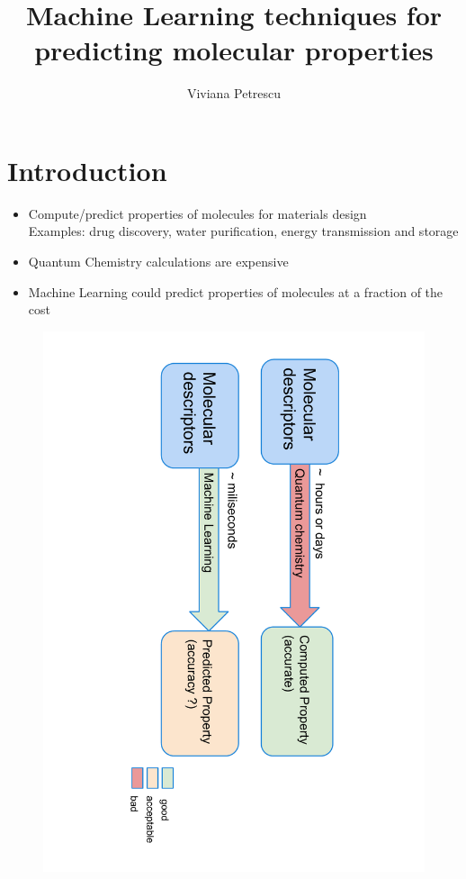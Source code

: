 \documentclass[12pt]{beamer}
\author{Viviana Petrescu}
\title{Machine Learning techniques for predicting molecular properties}
\begin{document}
\begin{frame}
\titlepage
\end{frame}

\begin{frame}
\tableofcontents
\end{frame}

\section{Introduction}
\begin{frame}
\begin{itemize}
\item Compute/predict properties of molecules for materials design\\
Examples: drug discovery, water purification, energy transmission and storage
\item Quantum Chemistry calculations are expensive
\item  Machine Learning could predict properties of molecules at a fraction of the cost
\end{itemize}
\end{frame}

  \begin{figure}[t]
    \centering
    \includegraphics[angle=90,origin=c,height=\dimexpr11\textheight/7\relax]{introslide}
  \end{figure}
  
\end{document}
